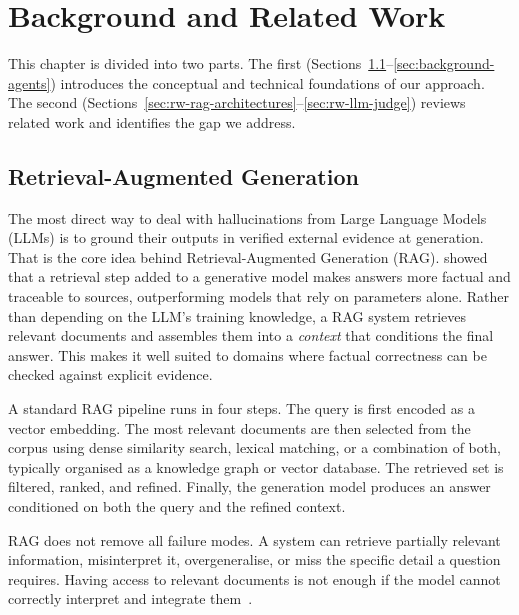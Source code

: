 \chapter{Background and Related Work}
\label{chap:background}

This chapter is divided into two parts. The first (Sections~\ref{sec:rag-fundamentals}--\ref{sec:background-agents}) introduces the conceptual and technical foundations of our approach. The second (Sections~\ref{sec:rw-rag-architectures}--\ref{sec:rw-llm-judge}) reviews related work and identifies the gap we address.


\section{Retrieval-Augmented Generation}
\label{sec:rag-fundamentals}

The most direct way to deal with hallucinations from Large Language Models (LLMs) is to ground their outputs in verified external evidence at generation. That is the core idea behind Retrieval-Augmented Generation (RAG). \citet{lewis2020retrieval} showed that a retrieval step added to a generative model makes answers more factual and traceable to sources, outperforming models that rely on parameters alone. Rather than depending on the LLM's training knowledge, a RAG system retrieves relevant documents and assembles them into a \emph{context} that conditions the final answer. This makes it well suited to domains where factual correctness can be checked against explicit evidence.

A standard RAG pipeline runs in four steps. The query is first encoded as a vector embedding. The most relevant documents are then selected from the corpus using dense similarity search, lexical matching, or a combination of both, typically organised as a knowledge graph or vector database. The retrieved set is filtered, ranked, and refined. Finally, the generation model produces an answer conditioned on both the query and the refined context.

RAG does not remove all failure modes. A system can retrieve partially relevant information, misinterpret it, overgeneralise, or miss the specific detail a question requires. Having access to relevant documents is not enough if the model cannot correctly interpret and integrate them~\citep{lewis2020retrieval}.

